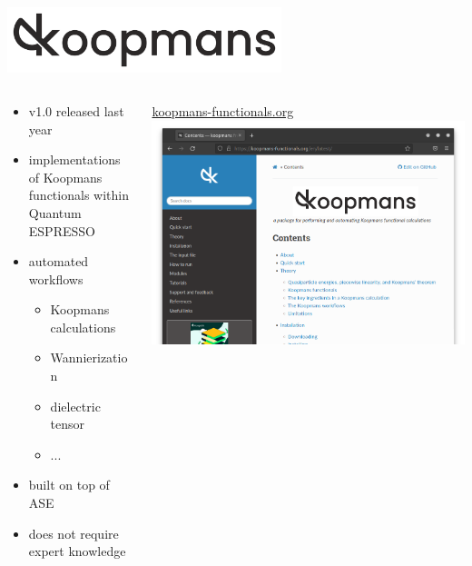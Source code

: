 \documentclass[xcolor=table,aspectratio=169]{beamer}
\numberwithin{equation}{section}
\begin{document}
\begin{frame}{}
   \begin{center}
      \includegraphics[width=0.6\textwidth]{figures/koopmans_grey_on_transparent.png}
   \end{center}

   \vspace{-2ex}

   \begin{columns}
      \begin{column}{0.55\textwidth}
         \begin{itemize}
            \item v1.0 released last year\footnotemark[1]
            \item implementations of Koopmans functionals within Quantum ESPRESSO
            \item automated workflows
                  \begin{itemize}
                     \item Koopmans calculations
                     \item Wannierization
                     \item dielectric tensor
                     \item ...
                  \end{itemize}
            \item built on top of ASE\footnotemark[2]
            \item does not require expert knowledge
         \end{itemize}
      \end{column}

      \begin{column}{0.4\textwidth}
         \centering
         \url{koopmans-functionals.org}
         \includegraphics[width=\columnwidth]{figures/website_cropped.png}
      \end{column}
   \end{columns}
\end{frame}
\end{document}
